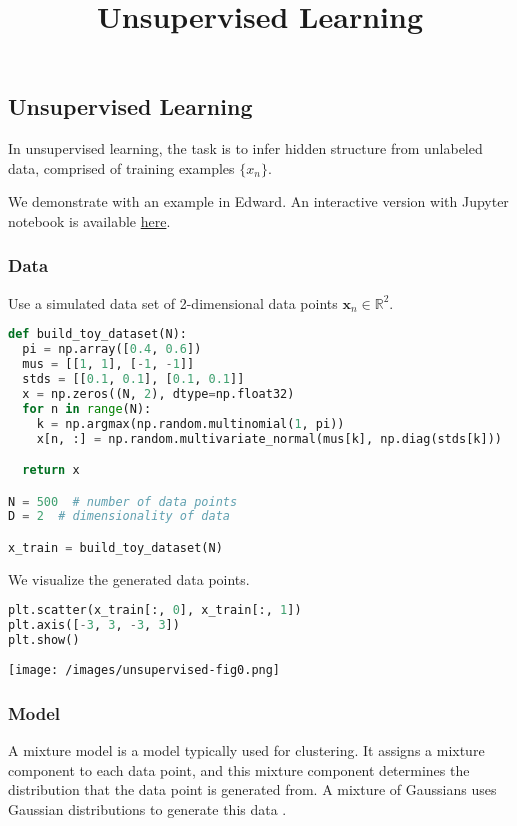 \title{Unsupervised Learning}

\subsection{Unsupervised Learning}

In unsupervised learning, the task is to infer hidden structure from
unlabeled data, comprised of training examples $\{x_n\}$.

We demonstrate with an example in Edward.
An interactive version with Jupyter notebook is available
\href{http://nbviewer.jupyter.org/github/blei-lab/edward/blob/master/notebooks/unsupervised.ipynb}{here}.

\subsubsection{Data}

Use a simulated data set of 2-dimensional data points
$\mathbf{x}_n\in\mathbb{R}^2$.
\begin{lstlisting}[language=Python]
def build_toy_dataset(N):
  pi = np.array([0.4, 0.6])
  mus = [[1, 1], [-1, -1]]
  stds = [[0.1, 0.1], [0.1, 0.1]]
  x = np.zeros((N, 2), dtype=np.float32)
  for n in range(N):
    k = np.argmax(np.random.multinomial(1, pi))
    x[n, :] = np.random.multivariate_normal(mus[k], np.diag(stds[k]))

  return x

N = 500  # number of data points
D = 2  # dimensionality of data

x_train = build_toy_dataset(N)
\end{lstlisting}

We visualize the generated data points.
\begin{lstlisting}[language=Python]
plt.scatter(x_train[:, 0], x_train[:, 1])
plt.axis([-3, 3, -3, 3])
plt.show()
\end{lstlisting}
\texttt{[image: /images/unsupervised-fig0.png]}

\subsubsection{Model}

A mixture model is a model typically used for clustering.
It assigns a mixture component to each data point, and this mixture component
determines the distribution that the data point is generated from. A
mixture of Gaussians uses Gaussian distributions to generate this data
\citep{bishop2006pattern}.

